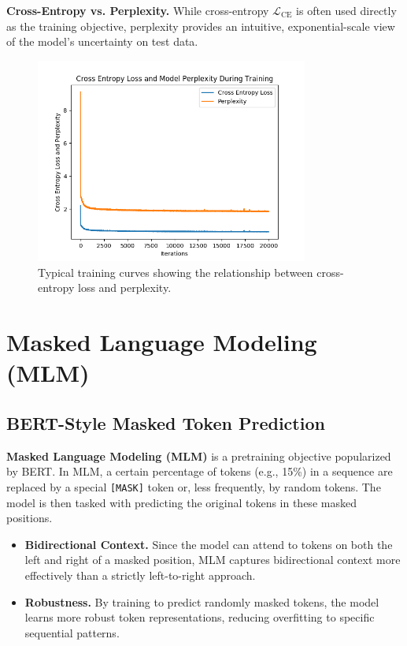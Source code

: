 \textbf{Cross-Entropy vs. Perplexity.}
While cross-entropy \(\mathcal{L}_\text{CE}\) is often used directly as the training objective, perplexity provides an intuitive, exponential-scale view of the model's uncertainty on test data.

\begin{figure}[ht]
    \centering
    \includegraphics[width=0.8\textwidth]{images/cross-entropy-perplexity.png}
    \caption{Typical training curves showing the relationship between cross-entropy loss and perplexity.}
    \label{fig:training_curves}
\end{figure}

\section{Masked Language Modeling (MLM)}
\label{sec:mlm}

\subsection{BERT-Style Masked Token Prediction}
\noindent
\textbf{Masked Language Modeling (MLM)} is a pretraining objective popularized by BERT. In MLM, a certain percentage of tokens (e.g., 15\%) in a sequence are replaced by a special \texttt{[MASK]} token or, less frequently, by random tokens. The model is then tasked with predicting the original tokens in these masked positions.

\begin{itemize}
    \item \textbf{Bidirectional Context.}
    Since the model can attend to tokens on both the left and right of a masked position, MLM captures bidirectional context more effectively than a strictly left-to-right approach.
    \item \textbf{Robustness.}
    By training to predict randomly masked tokens, the model learns more robust token representations, reducing overfitting to specific sequential patterns.
\end{itemize}

